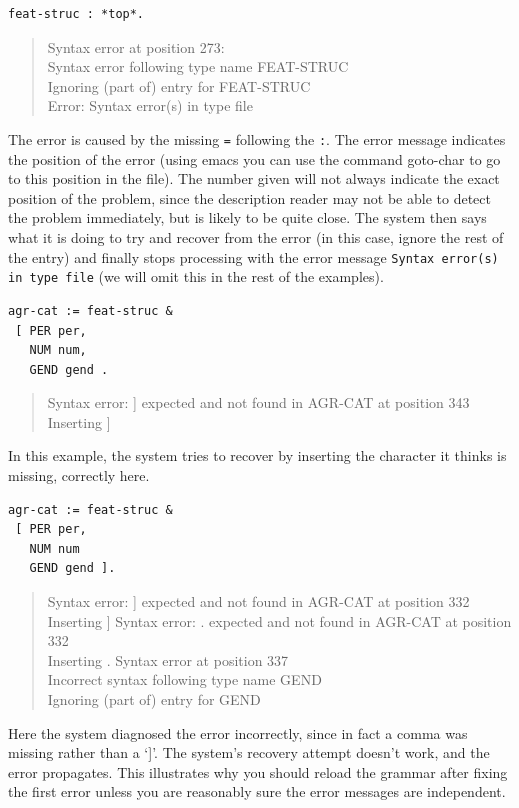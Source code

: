 \documentclass[12pt]{report}
\newenvironment{error}%
{\begin{quote}
\tt
}%
{\end{quote}
}
\begin{document}
\begin{verbatim}
feat-struc : *top*.
\end{verbatim}
\begin{error}
Syntax error at position 273: \\
Syntax error following type name FEAT-STRUC\\
Ignoring (part of) entry for FEAT-STRUC\\
Error: Syntax error(s) in type file
\end{error}
The error is caused by the missing {\tt =} following the
{\tt :}.  The error message indicates the position of
the error (using emacs you can use the command goto-char to
go to this position in the file).  The number given will
not always indicate the exact position of the problem, since the description reader
may not be able to detect the problem immediately, but is likely to be quite close.  
The system then says what it is doing to try and recover from the error
(in this case, ignore the rest of the entry) and finally stops processing with
the error message {\tt Syntax error(s) in type file} (we will
omit this in the rest of the examples).

\begin{verbatim}
agr-cat := feat-struc &
 [ PER per,
   NUM num,
   GEND gend .
\end{verbatim}
\begin{error}
Syntax error: ] expected and not found in AGR-CAT at position 343\\
Inserting ]
\end{error}
In this example, the system tries to recover by inserting the character
it thinks is missing, correctly here.

\begin{verbatim}
agr-cat := feat-struc &
 [ PER per,
   NUM num
   GEND gend ]. 
\end{verbatim}
\begin{error}
Syntax error: ] expected and not found in AGR-CAT at position 332\\
Inserting ]
Syntax error: . expected and not found in AGR-CAT at position 332\\
Inserting .
Syntax error at position 337\\
Incorrect syntax following type name GEND\\
Ignoring (part of) entry for GEND
\end{error}
Here the system diagnosed the error incorrectly, since in fact
a comma was missing rather than a `]'.  
The system's recovery attempt doesn't work, and the error 
propagates.  This illustrates
why you should reload the grammar after fixing the first error
unless you are reasonably sure the error messages are independent.
\end{document}
